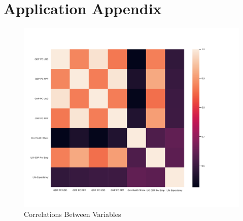 \documentclass[10pt]{article}
\begin{document}
        \begin{table}[!htbp] \centering
            \caption{Average Coefficients for Values of $p$ ($N=3,000$, Exponential Transformation) \label{sim_p_3000_exp}}
        \end{table}


\clearpage

    \section*{Application Appendix}

        \begin{figure}[H]
            \centering
            \caption{Correlations Between Variables}
            \label{LE_Health_Econ_Correlations}	
            \includegraphics[width=\linewidth,keepaspectratio=true]{../Output/Figures/LE_Health_Econ_Correlations_wb_only_short.pdf}
        \end{figure}
\end{document}

